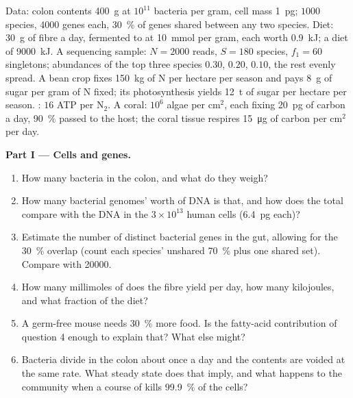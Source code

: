 \begin{problem}
\label{pb:b3:microbiomes:1}
Data: colon contents \qty{400}{g} at $10^{11}$ bacteria per gram, cell
mass \qty{1}{pg}; $1000$ species, \num{4000} genes each, \qty{30}{\%}
of genes shared between any two species. Diet: \qty{30}{g} of fibre a
day, fermented to  at \qty{10}{mmol} per gram,
each worth \qty{0.9}{kJ}; a diet of \qty{9000}{kJ}. A sequencing sample:
$N = 2000$ reads, $S = 180$ species, $f_{1} = 60$ singletons; abundances
of the top three species $0.30$, $0.20$, $0.10$, the rest evenly spread.
A bean crop fixes \qty{150}{kg} of N per hectare per season and pays
\qty{8}{g} of sugar per gram of N fixed; its photosynthesis yields
\qty{12}{t} of sugar per hectare per season. : $16$ ATP per
N$_{2}$. A coral: $10^{6}$ algae per cm$^{2}$, each fixing \qty{20}{pg}
of carbon a day, \qty{90}{\%} passed to the host; the coral tissue
respires \qty{15}{\micro g} of carbon per cm$^{2}$ per day.

\medskip
\noindent\textbf{Part I --- Cells and genes.}
\begin{enumerate}
  \item How many bacteria in the colon, and what do they weigh?
  \item How many bacterial genomes' worth of DNA is that, and how does
        the total compare with the DNA in the $3\times 10^{13}$ human
        cells (\qty{6.4}{pg} each)?
  \item Estimate the number of distinct bacterial genes in the gut,
        allowing for the \qty{30}{\%} overlap (count each species'
        unshared \qty{70}{\%} plus one shared set). Compare with
        \num{20000}.
  \item How many millimoles of  does the fibre
        yield per day, how many kilojoules, and what fraction of the
        diet?
  \item A germ-free mouse needs \qty{30}{\%} more food. Is the fatty-acid
        contribution of question 4 enough to explain that? What else
        might?
  \item Bacteria divide in the colon about once a day and the contents
        are voided at the same rate. What steady state does that imply,
        and what happens to the community when a course of 
        kills \qty{99.9}{\%} of the cells?
\end{enumerate}


\end{problem}
